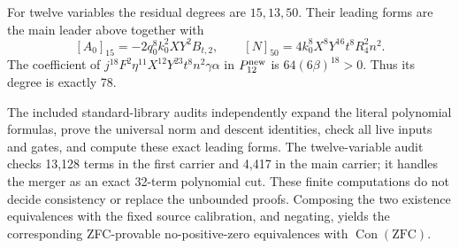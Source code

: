 For twelve variables the residual degrees are $15,13,50$. Their leading
forms are the main leader above together with
\[
 [A_0]_{15}=-2q_0^8k_0^2XY^2B_{t,2},\qquad
 [N]_{50}=4k_0^8X^8Y^{16}t^8R_4^2n^2.
\]
The coefficient of
$j^{18}F^2\eta^{11}X^{12}Y^{23}t^8n^2\gamma\alpha$ in
$P_{12}^{\rm new}$ is $64(6\beta)^{18}>0$. Thus its degree is exactly 78.

The included standard-library audits independently expand the literal
polynomial formulas, prove the universal norm and descent identities,
check all live inputs and gates, and compute these exact leading forms.
The twelve-variable audit checks 13,128 terms in the first carrier and
4,417 in the main carrier; it handles the merger as an exact 32-term
polynomial cut. These finite computations do not decide consistency or
replace the unbounded proofs. Composing the two existence equivalences
with the fixed source calibration, and negating, yields the corresponding
ZFC-provable no-positive-zero equivalences with $\operatorname{Con}(\mathrm{ZFC})$.
